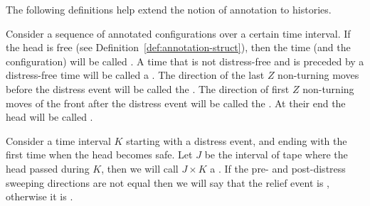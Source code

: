 \documentclass[12pt]{memoir}
\newcommand{\authnote}[3]
{\text{{ \textcolor{#3}{\( \langle\hspace{-0.2em}\langle \)\textsf{\footnotesize #1: #2}\( \rangle\hspace{-0.2em}\rangle \)}}}}
\newcommand{\authnote}[2]{}
\newcommand{\Pnote}[1]{{\authnote{P}{#1}{cyan}}}
\renewcommand{\ge}{\geq}
\def\B{B}
\newcommand{\Z}{Z}
\begin{document}



The following definitions help extend the notion of annotation to histories.

\begin{definition}\label{def:safe}
Consider a sequence of annotated configurations over a certain time interval.
If the head is free (see Definition~\ref{def:annotation-struct}), then
the time (and the configuration) will be called .
A time that is not distress-free and is preceded by
a distress-free time will be called a .
The direction of the last \( \Z \) non-turning moves before the distress event
will be called the .
The direction of first \( \Z \) non-turning moves of the front after the distress event
will be called the .
At their end the head will be called .

Consider a time interval \( K \) starting
with a distress event, and ending with the first time when the head becomes safe.
Let \( J \) be the interval of tape where the head passed during \( K \), then 
we will call \( J\times K \) a .
If the pre- and post-distress sweeping directions are not equal then
we will say that the relief event is , otherwise it is .
\end{definition}
\end{document}

